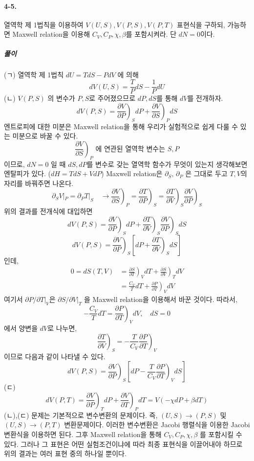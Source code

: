 \documentclass[a4paper,12pt]{report}
\newcommand{\Maxwell}[3][]{\left.\frac{\partial #2}{\partial #3} \right)_{#1} }
\begin{document}
	\paragraph{4-5. } 열역학 제 1법칙을 이용하여 $V(U,S), V(P,S), V(P,T)$ 표현식을 구하되, 가능하면 Maxwell relation을 이용해 $C_V, C_P, \chi, \beta$를 포함시켜라. 단 $dN=0$이다.
	\subparagraph{풀이} (ㄱ) 열역학 제 1법칙 $dU=TdS-PdV$ 에 의해
	$$dV(U,S)=\frac{T}{P}dS-\frac{1}{P}dU$$
	(ㄴ) $V(P,S)$ 의 변수가 $P,S$로 주어졌으므로 $dP,dS$를 통해  $dV$를 전개하자.
	$$dV(P,S)=\left. \frac{\partial V}{\partial P}\right) _{S}dP+\left.\frac{\partial V}{\partial S} \right)_{P}dS $$ 엔트로피에 대한 미분은 Maxwell relation을 통해 우리가 실험적으로 쉽게 다룰 수 있는 미분으로 바꿀 수 있다. 
	$$\left. \frac{\partial V}{\partial S}\right)_P \mbox{ 에 연관된 열역학 변수는 }S,P $$
	이므로, $dN=0$ 일 때 $dS,dP$를 변수로 갖는 열역학 함수가 무엇이 있는지 생각해보면 엔탈피가 있다. ($dH=TdS+VdP$) Maxwell relation은 $\partial_S, \, \partial_P$ 은 그대로 두고 $T,V$의 자리를 바꿔주면 나온다. 
	$$\partial_S V|_P=\partial_P T|_S \quad\rightarrow\left. \frac{\partial V}{\partial S}\right)_P=\left. \frac{\partial T}{\partial P}\right)_S=\left. \frac{\partial T}{\partial V}\right)_S\left. \frac{\partial V}{\partial P}\right)_S $$ 
	위의 결과를 전개식에 대입하면
	$$dV(P,S)=\left. \frac{\partial V}{\partial P}\right) _{S}dP+\left. \frac{\partial T}{\partial V}\right)_S\left. \frac{\partial V}{\partial P}\right)_SdS $$
	$$dV(P,S)=\left. \frac{\partial V}{\partial P}\right) _{S}\left[ dP+\left. \frac{\partial T}{\partial V}\right)_S dS\right] $$
	인데, 
	\begin{equation*}
	\begin{split}0=dS(T,V)&=\Maxwell[V]{S}{T}dT+\Maxwell[T]{S}{V}dV\\
	&=\frac{C_V}{T}dT+\Maxwell[V]{P}{T}dV \end{split}
	\end{equation*}
	여기서  $\partial P/\partial T|_V$은 $\partial S/\partial V|_T$  을 Maxwell relation을 이용해서 바꾼 것이다. 따라서,
	$$-\frac{C_V}{T}dT=\Maxwell[V]{P}{T}dV, \quad dS=0$$
	에서 양변을 $dV$로 나누면,
	$$\Maxwell[S]{T}{V}=-\frac{T}{C_V}\Maxwell[V]{P}{T}$$
	이므로 다음과 같이 나타낼 수 있다.
	$$dV(P,S)=\Maxwell[S]{V}{P}\left[ dP-\frac{T}{C_V}\Maxwell[V]{P}{T}dS\right] $$
	(ㄷ)
	$$dV(P,T)=\Maxwell[T]{V}{P}dP+\Maxwell[P]{V}{T}dT=V(-\chi dP+\beta dT)$$
	(ㄴ),(ㄷ) 문제는 기본적으로 변수변환의 문제이다. 즉, $(U,S)\rightarrow(P,S)$ 및 $(U,S)\rightarrow(P,T)$ 변환문제이다. 이러한 변수변환은 Jacobi 행렬식을 이용한 Jacobi 변환식을 이용하면 된다. 그후 Maxwell relation을 통해 $C_V,C_P,\chi, \beta$ 를 포함시킬 수 있다. 그러나 그 표현은 어떤 실험조건이냐에 따라 최종 표현식을 이끌어내야 하므로 위의 결과는 여러 표현 중의 하나일 뿐이다. 
\end{document}
